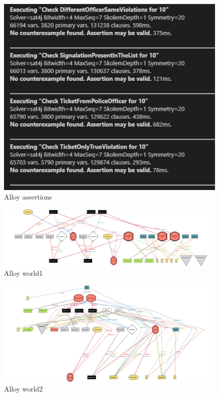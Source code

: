 \documentclass{article}
\begin{document}
\begin{figure}[H]
    \centering
    \includegraphics[scale=1]{Images/Alloy-Assertions}
    \caption{Alloy assertions}
\end{figure}
\begin{figure}[H]
    \centering
    \includegraphics[angle=90,scale=0.48]{Images/Alloy-World1}
    \caption{Alloy world1}
\end{figure}
\begin{figure}[H]
    \centering
    \includegraphics[angle=90,scale=0.35]{Images/Alloy-World2}
    \caption{Alloy world2}
\end{figure}
\end{document}
